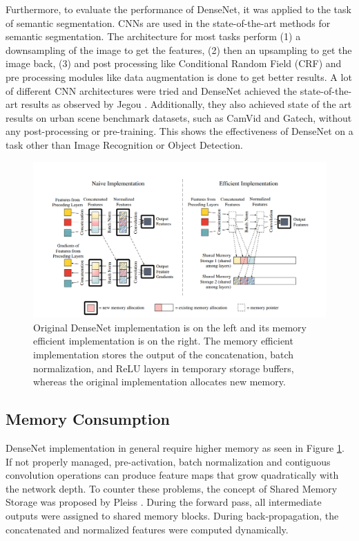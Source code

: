 \documentclass[11pt,twocolumn,letterpaper]{article}
\begin{document}
Furthermore, to evaluate the performance of DenseNet, it was applied to the task of semantic segmentation. CNNs are used in the state-of-the-art methods for semantic segmentation. The architecture for most tasks perform (1) a downsampling of the image to get the features, (2) then an upsampling to get the image back, (3) and post processing like Conditional Random Field (CRF)\cite{Lafferty:2001:CRF:645530.655813} and pre processing modules like data augmentation is done to get better results. A lot of different CNN architectures were tried and DenseNet achieved the state-of-the-art results as observed by Jegou \etal \cite{DBLP:journals/corr/JegouDVRB16}. Additionally, they also achieved state of the art results on urban scene benchmark datasets, such as CamVid\cite{BrostowSFC:ECCV08} and Gatech, without any post-processing or pre-training. This shows the effectiveness of DenseNet on a task other than Image Recognition or Object Detection.

\begin{figure}
	\begin{center}
		\includegraphics[width=\linewidth]{image_memory.png}
	\end{center}
	\caption{Original DenseNet implementation is on the left and its memory efficient implementation is on the right. The memory efficient implementation stores the output of the concatenation, batch normalization, and ReLU layers in temporary storage buffers, whereas the original implementation allocates new memory.}
	\label{fig: image_memory.png}
\end{figure} 

\subsection{Memory Consumption}

DenseNet implementation in general require higher memory as seen in Figure \ref{fig: image_memory.png}. If not properly managed, pre-activation, batch normalization and contiguous convolution operations can produce feature maps that grow quadratically with the network depth. To counter these problems, the concept of Shared Memory Storage was proposed by Pleiss \etal \cite{DBLP:journals/corr/PleissCHLMW17}. During the forward pass, all intermediate outputs were assigned to shared memory blocks. During back-propagation, the concatenated and normalized features were computed dynamically.
\end{document}
